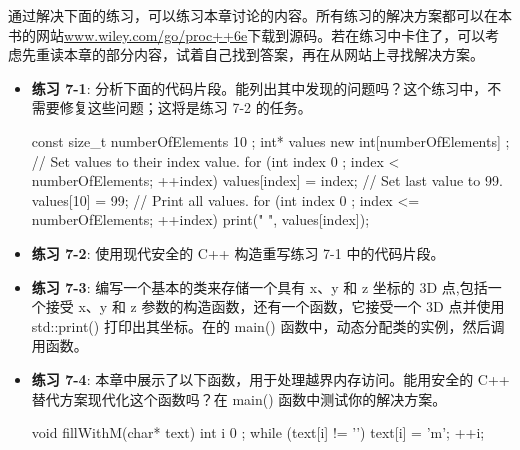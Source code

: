 通过解决下面的练习，可以练习本章讨论的内容。所有练习的解决方案都可以在本书的网站\url{www.wiley.com/go/proc++6e}下载到源码。若在练习中卡住了，可以考虑先重读本章的部分内容，试着自己找到答案，再在从网站上寻找解决方案。

\begin{itemize}
\item
\textbf{练习 7-1}: 分析下面的代码片段。能列出其中发现的问题吗？这个练习中，不需要修复这些问题；这将是练习 7-2 的任务。

\begin{cpp}
const size_t numberOfElements { 10 };
int* values { new int[numberOfElements] };
// Set values to their index value.
for (int index { 0 }; index < numberOfElements; ++index) {
    values[index] = index;
}
// Set last value to 99.
values[10] = 99;
// Print all values.
for (int index { 0 }; index <= numberOfElements; ++index) {
    print("{} ", values[index]);
}
\end{cpp}

\item
\textbf{练习 7-2}: 使用现代安全的 C++ 构造重写练习 7-1 中的代码片段。

\item
\textbf{练习 7-3}: 编写一个基本的类来存储一个具有 x、y 和 z 坐标的 3D 点,包括一个接受 x、y 和 z 参数的构造函数，还有一个函数，它接受一个 3D 点并使用 std::print() 打印出其坐标。在的 main() 函数中，动态分配类的实例，然后调用函数。

\item
\textbf{练习 7-4}: 本章中展示了以下函数，用于处理越界内存访问。能用安全的 C++ 替代方案现代化这个函数吗？在 main() 函数中测试你的解决方案。

\begin{cpp}
void fillWithM(char* text)
{
    int i { 0 };
    while (text[i] != '\0') {
        text[i] = 'm';
        ++i;
    }
}
\end{cpp}
\end{itemize}
